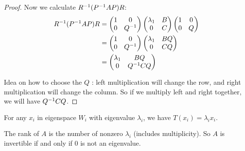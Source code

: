 \begin{proof}
    Now we calculate ${R}^{-1} ({P}^{-1} A P) R$:
    \begin{equation*}
        \begin{aligned}
            {R}^{-1} ({P}^{-1} A P) R  &= \begin{pmatrix}
                1 & 0 \\
                0 & {Q}^{-1}
            \end{pmatrix} \begin{pmatrix}
                \lambda_1 & B \\
                0 & C
            \end{pmatrix} \begin{pmatrix}
                1 & 0 \\
                0 & Q
            \end{pmatrix} \\
            & = \begin{pmatrix}
                1 & 0 \\
                0 & {Q}^{-1}
            \end{pmatrix} \begin{pmatrix}
                \lambda_1 & B Q \\
                0 & C Q
            \end{pmatrix} \\
            &= \begin{pmatrix}
                \lambda_1 & BQ \\
                0 & {Q}^{-1} C Q
            \end{pmatrix}
        \end{aligned}     
    \end{equation*}
    
    Idea on how to choose the $Q$ : left multiplication will change the row, and right multiplication will change the column. So if we multiply left and right together, we will have ${Q}^{-1} C Q$.
\end{proof}

\begin{theorem}
    For any $x_i$ in eigenspace $W_i$ with eigenvalue $\lambda_i$, we have $T(x_i) = \lambda_i x_i$.
\end{theorem}

\begin{theorem}
    The rank of $A$ is the number of nonzero $\lambda_i$ (includes multiplicity). So $A$ is invertible if and only if $0$ is not an eigenvalue.    
\end{theorem}

